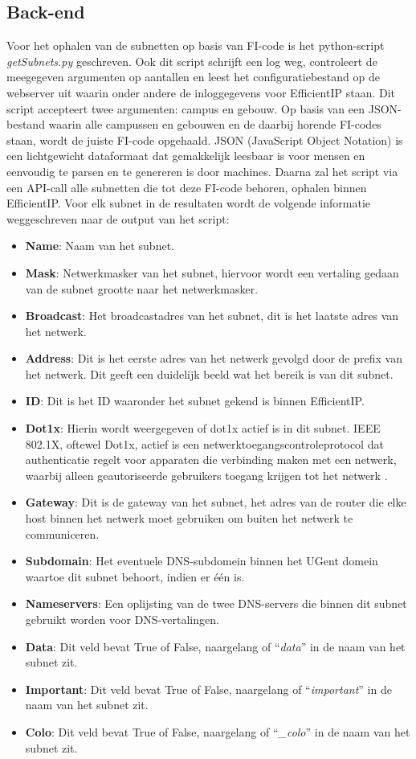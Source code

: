 \subsection{Back-end}
Voor het ophalen van de subnetten op basis van FI-code is het python-script \textit{getSubnets.py} geschreven. Ook dit script schrijft een log weg, controleert de meegegeven argumenten op aantallen en leest het configuratiebestand op de webserver uit waarin onder andere de inloggegevens voor EfficientIP staan. Dit script accepteert twee argumenten: campus en gebouw. Op basis van een JSON-bestand waarin alle campussen en gebouwen en de daarbij horende FI-codes staan, wordt de juiste FI-code opgehaald. JSON (JavaScript Object Notation) is een lichtgewicht dataformaat dat gemakkelijk leesbaar is voor mensen en eenvoudig te parsen en te genereren is door machines. Daarna zal het script via een API-call alle subnetten die tot deze FI-code behoren, ophalen binnen EfficientIP. Voor elk subnet in de resultaten wordt de volgende informatie weggeschreven naar de output van het script:
\begin{itemize}
    \item \textbf{Name}: Naam van het subnet.
    \item \textbf{Mask}: Netwerkmasker van het subnet, hiervoor wordt een vertaling gedaan van de subnet grootte naar het netwerkmasker.
    \item \textbf{Broadcast}: Het broadcastadres van het subnet, dit is het laatste adres van het netwerk.
    \item \textbf{Address}: Dit is het eerste adres van het netwerk gevolgd door de prefix van het netwerk. Dit geeft een duidelijk beeld wat het bereik is van dit subnet.
    \item \textbf{ID}: Dit is het ID waaronder het subnet gekend is binnen EfficientIP.
    \item \textbf{Dot1x}: Hierin wordt weergegeven of dot1x actief is in dit subnet. IEEE 802.1X, oftewel Dot1x, actief is een netwerktoegangscontroleprotocol dat authenticatie regelt voor apparaten die verbinding maken met een netwerk, waarbij alleen geautoriseerde gebruikers toegang krijgen tot het netwerk \autocite{Brown2006}.
    \item \textbf{Gateway}: Dit is de gateway van het subnet, het adres van de router die elke host binnen het netwerk moet gebruiken om buiten het netwerk te communiceren.
    \item \textbf{Subdomain}: Het eventuele DNS-subdomein binnen het UGent domein waartoe dit subnet behoort, indien er één is.
    \item \textbf{Nameservers}: Een oplijsting van de twee DNS-servers die binnen dit subnet gebruikt worden voor DNS-vertalingen.
    \item \textbf{Data}: Dit veld bevat True of False, naargelang of “\textit{data}” in de naam van het subnet zit.
    \item \textbf{Important}: Dit veld bevat True of False, naargelang of “\textit{important}” in de naam van het subnet zit.
    \item \textbf{Colo}: Dit veld bevat True of False, naargelang of “\textit{\_colo}” in de naam van het subnet zit.
\end{itemize}
